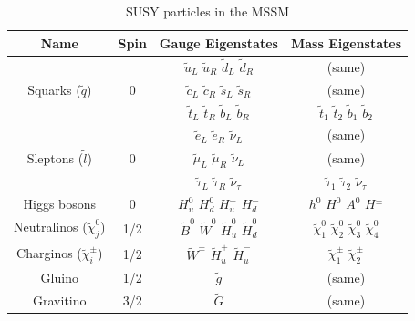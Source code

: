 				\begin{table}[!htb]\centering\caption{SUSY particles in the MSSM}							
					\begin{tabular}{|c|c|c|c|}
						\hline
						\textbf{Name} & \textbf{Spin} & \textbf{Gauge Eigenstates} & \textbf{Mass Eigenstates} \\ \hline \hline
						
						\multirow{3}{*}{Squarks ($\tilde{q}$)} & \multirow{3}{*}{0} 
						& $\tilde{u}_L$ $\tilde{u}_R$ $\tilde{d}_L$ $\tilde{d}_R$ & (same) \\
						& & $\tilde{c}_L$ $\tilde{c}_R$ $\tilde{s}_L$ $\tilde{s}_R$ & (same) \\
						& & $\tilde{t}_L$ $\tilde{t}_R$ $\tilde{b}_L$ $\tilde{b}_R$ & $\tilde{t}_1$ $\tilde{t}_2$ $\tilde{b}_1$ $\tilde{b}_2$ \\ \hline

						\multirow{3}{*}{Sleptons ($\tilde{l}$)} & \multirow{3}{*}{0} 
						& $\tilde{e}_L$ $\tilde{e}_R$ $\tilde{\nu}_L$ & (same) \\
						& & $\tilde{\mu}_L$ $\tilde{\mu}_R$ $\tilde{\nu}_L$ & (same) \\ 
						& & $\tilde{\tau}_L$ $\tilde{\tau}_R$ $\tilde{\nu}_{\tau}$ & $\tilde{\tau}_1$ $\tilde{\tau}_2$ $\tilde{\nu}_{\tau}$ \\ \hline
						
						Higgs bosons & 0 & $H_u^0$ $H_d^0$ $H_u^+$ $H_d^-$ & $h^0$ $H^0$ $A^0$ $H^{\pm}$ \\ \hline 

						Neutralinos ($\tilde{\chi}_j^0$)   & 1/2 & $\tilde{B}^0$ $\tilde{W}^0$ $\tilde{H}_u^0$ $\tilde{H}_d^0$ & $\tilde{\chi}_1^0$ $\tilde{\chi}_2^0$ $\tilde{\chi}_3^0$ $\tilde{\chi}_4^0$\\
						Charginos ($\tilde{\chi}_i^{\pm}$) & 1/2 & $\tilde{W}^{\pm}$ $\tilde{H}_u^+$ $\tilde{H}_u^-$ & $\tilde{\chi}_1^{\pm}$ $\tilde{\chi}_2^{\pm}$ \\ \hline

						Gluino & 1/2 & $\tilde{g}$ & (same) \\
						Gravitino & 3/2 & $\tilde{G}$ & (same) \\ \hline					
					\end{tabular}						
				\label{tab:MSSM_particles} 
				\end{table}



